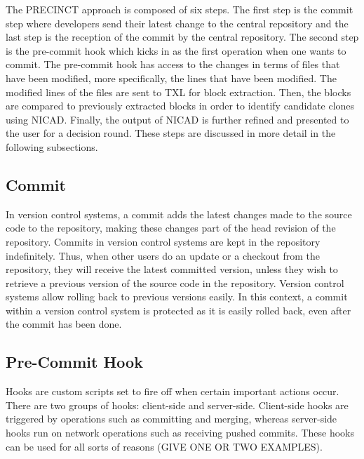 \documentclass[conference]{IEEEtran}
\begin{document}
The PRECINCT approach is composed of six steps.
The first step is the commit step where developers send their latest change to the central repository and the last step is the reception of the commit by the central repository.
The second step is the pre-commit hook which kicks in as the first operation when one wants to commit.
The pre-commit hook has access to the changes in terms of files that have been modified, more specifically, the lines that have been modified. The modified lines of the files are sent to TXL\cite{Cordy2006a} for block extraction. Then, the blocks are compared to previously extracted blocks in order to identify candidate clones  using NICAD\cite{Cordy2011}.
 Finally, the output of NICAD is further refined and presented to the user for a decision round. These steps are discussed in more detail in the following subsections.

\subsection{Commit}
\label{sub:Commit}

In version control systems, a commit adds the latest changes made to the source code to the repository, making these changes part of the head revision of the repository.
Commits in version control systems are kept in the repository indefinitely. Thus, when other users do an update or a checkout from the repository, they will receive the latest committed version, unless they wish to retrieve a previous version of the source code in the repository.
Version control systems allow rolling back to previous versions easily.
In this context, a commit within a version control system is protected as it is easily rolled back, even after the commit has been done.

\subsection{Pre-Commit Hook}
\label{sub:Pre-Commit Hook}

Hooks are custom scripts set to fire off when certain important actions occur.
There are two groups of  hooks: client-side and server-side.
Client-side hooks are triggered by operations such as committing and merging, whereas server-side hooks run on network operations such as receiving pushed commits.
These hooks can be used for all sorts of reasons (GIVE ONE OR TWO EXAMPLES).
\end{document}
